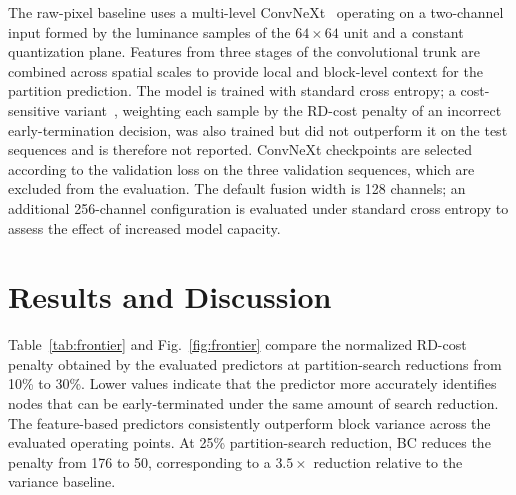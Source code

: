 \documentclass{article}
\begin{document}
The raw-pixel baseline uses a multi-level ConvNeXt~\cite{liu2022convnext} operating on a two-channel input formed by the luminance samples of the $64\times64$ unit and a constant quantization plane. Features from three stages of the convolutional trunk are combined across spatial scales to provide local and block-level context for the partition prediction. The model is trained with standard cross entropy; a cost-sensitive variant~\cite{elkan2001costsensitivelearning}, weighting each sample by the RD-cost penalty of an incorrect early-termination decision, was also trained but did not outperform it on the test sequences and is therefore not reported. ConvNeXt checkpoints are selected according to the validation loss on the three validation sequences, which are excluded from the evaluation. The default fusion width is 128 channels; an additional 256-channel configuration is evaluated under standard cross entropy to assess the effect of increased model capacity.



\section{Results and Discussion}

Table~\ref{tab:frontier} and Fig.~\ref{fig:frontier} compare the normalized RD-cost penalty obtained by the evaluated predictors at partition-search reductions from 10\% to 30\%. Lower values indicate that the predictor more accurately identifies nodes that can be early-terminated under the same amount of search reduction. The feature-based predictors consistently outperform block variance across the evaluated operating points. At 25\% partition-search reduction, BC reduces the penalty from 176 to 50, corresponding to a $3.5\times$ reduction relative to the variance baseline.
\end{document}
